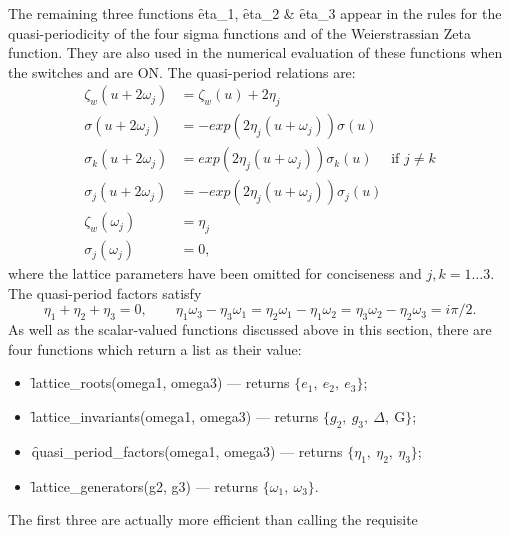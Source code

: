 \hypertarget{operator:ETA_1}{}
\hypertarget{operator:ETA_2}{}
\hypertarget{operator:ETA_3}{}
The remaining three functions \f{eta\_1}, \f{eta\_2} \& \f{eta\_3} appear in
the rules for the quasi-periodicity of the four sigma functions and of the
Weierstrassian Zeta function. They are also used in the numerical
evaluation of these functions when the switches  and 
are ON. The quasi-period relations are:
\begin{align*}
  \zeta_w(u+2\omega_j) & = \zeta_w(u)+2\eta_j\\
  \sigma(u+2\omega_j) & = -exp(2\eta_j(u+\omega_j))\sigma(u)\\
  \sigma_k(u+2\omega_j) & =  exp(2\eta_j(u+\omega_j))\sigma_k(u) \quad\text{  if  }j\neq k\\
  \sigma_j(u+2\omega_j) & = -exp(2\eta_j(u+\omega_j))\sigma_j(u)\\
  \zeta_w(\omega_j) & = \eta_j\\
  \sigma_j(\omega_j) & = 0,
\end{align*}
where the lattice parameters have been omitted for conciseness and $j,k = 1\ldots 3$.
The quasi-period factors satisfy
\[\eta_1+\eta_2+\eta_3=0,\qquad
   \eta_1\omega_3-\eta_3\omega_1=\eta_2\omega_1-\eta_1\omega_2=\eta_3\omega_2-\eta_2\omega_3=i\pi/2.\]
As well as the scalar-valued functions discussed above in this section,
there are four functions which return a list as their value:
\hypertarget{operator:LATTICE_ROOTS}{}
\hypertarget{operator:LATTICE_INVARIANTS}{}
\hypertarget{operator:LATTICE_GENERATORS}{}
\hypertarget{operator:QUASI_PERIOD_FACTORS}{}
\begin{itemize}[left=3mm]
\item \f{lattice\_roots(omega1, omega3)} --- returns $\{e_1,\ e_2,\ e_3\}$;
\item \f{lattice\_invariants(omega1, omega3)} --- returns
  $\{g_2,\ g_3,\ \Delta,\ \mathrm{G}\}$;
\item \f{quasi\_period\_factors(omega1, omega3)}
  --- returns $\{\eta_1,\ \eta_2,\ \eta_3\}$;
\item \f{lattice\_generators(g2, g3)}  --- returns $\{\omega_1,\ \omega_3\}$.
\end{itemize}
The first three are actually more efficient than calling the requisite
